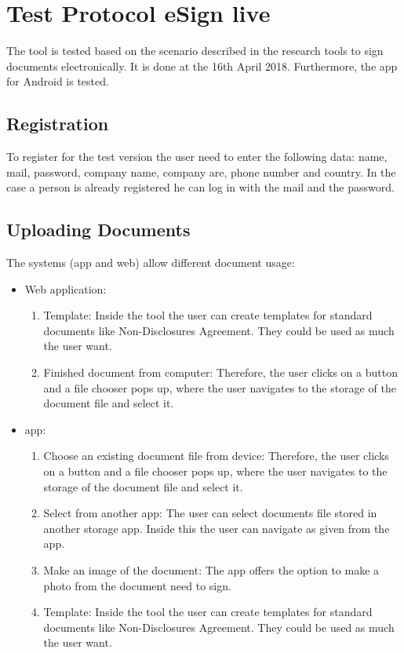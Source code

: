 \section{Test Protocol eSign live}
\label{sec:esign}
The tool is tested based on the scenario described in the research tools to sign documents electronically. It is done at the 16th April 2018. Furthermore, the \gls{app} for Android is tested.

\subsection{Registration}
To register for  the test version the user need to enter the following data: name, mail, password, company name, company are, phone number and country. In the case a person is already registered he can log in with the mail and the password.

\subsection{Uploading Documents}
The systems (\gls{app} and web) allow different document usage:
\begin{itemize}
	\item Web application:
	\begin{enumerate}
		\item Template: Inside the tool the user can create templates for standard documents like Non-Disclosures Agreement. They could be used as much the user want.
		\item Finished document from computer: Therefore, the user clicks on a button and a file chooser pops up, where the user navigates to the storage of the document file and select it.
	\end{enumerate}
	\item \Gls{app}:
	\begin{enumerate}
		\item Choose an existing document file from device: Therefore, the user clicks on a button and a file chooser pops up, where the user navigates to the storage of the document file and select it.
		\item Select from another \gls{app}: The user can select documents file stored in another storage \gls{app}. Inside this the user can navigate as given from the \gls{app}.
		\item Make an image of the document: The \gls{app} offers the option to make a photo from the document need to sign.
		\item Template: Inside the tool the user can create templates for standard documents like Non-Disclosures Agreement. They could be used as much the user want.
	\end{enumerate}
\end{itemize}

